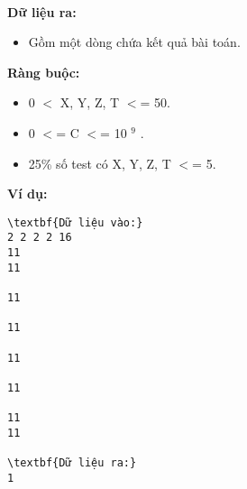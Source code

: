  

\textbf{Dữ liệu ra: }
\begin{itemize}
	\item 

Gồm một dòng chứa kết quả bài toán.
\end{itemize}

\textbf{Ràng buộc: }
\begin{itemize}
	\item 0 $<$ X, Y, Z, T $<$= 50.
	\item 0 $<$= C $<$= 10 $^ 9 $ .
	\item 25\% số test có X, Y, Z, T $<$= 5.
\end{itemize}

\textbf{Ví dụ: }
\begin{verbatim}
\textbf{Dữ liệu vào:}
2 2 2 2 16
11
11

11

11

11

11

11
11

\textbf{Dữ liệu ra:}
1
\end{verbatim}